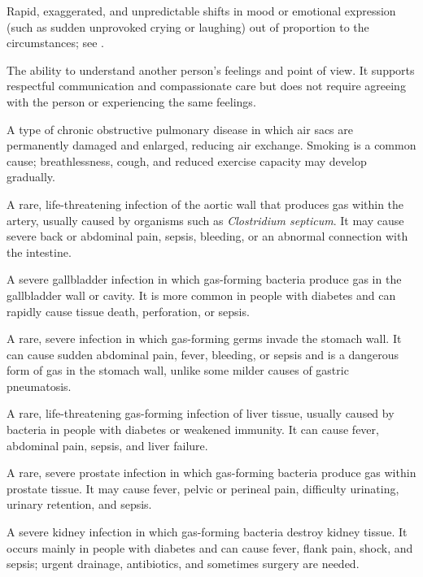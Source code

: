  Rapid, exaggerated, and unpredictable shifts in mood or emotional expression (such as sudden unprovoked crying or laughing) out of proportion to the circumstances; see .

 The ability to understand another person’s feelings and point of view. It supports respectful communication and compassionate care but does not require agreeing with the person or experiencing the same feelings.

 A type of chronic obstructive pulmonary disease in which air sacs are permanently damaged and enlarged, reducing air exchange. Smoking is a common cause; breathlessness, cough, and reduced exercise capacity may develop gradually.

 A rare, life-threatening infection of the aortic wall that produces gas within the artery, usually caused by organisms such as \textit{Clostridium septicum}. It may cause severe back or abdominal pain, sepsis, bleeding, or an abnormal connection with the intestine.

 A severe gallbladder infection in which gas-forming bacteria produce gas in the gallbladder wall or cavity. It is more common in people with diabetes and can rapidly cause tissue death, perforation, or sepsis.

 A rare, severe infection in which gas-forming germs invade the stomach wall. It can cause sudden abdominal pain, fever, bleeding, or sepsis and is a dangerous form of gas in the stomach wall, unlike some milder causes of gastric pneumatosis.

 A rare, life-threatening gas-forming infection of liver tissue, usually caused by bacteria in people with diabetes or weakened immunity. It can cause fever, abdominal pain, sepsis, and liver failure.

 A rare, severe prostate infection in which gas-forming bacteria produce gas within prostate tissue. It may cause fever, pelvic or perineal pain, difficulty urinating, urinary retention, and sepsis.

 A severe kidney infection in which gas-forming bacteria destroy kidney tissue. It occurs mainly in people with diabetes and can cause fever, flank pain, shock, and sepsis; urgent drainage, antibiotics, and sometimes surgery are needed.

